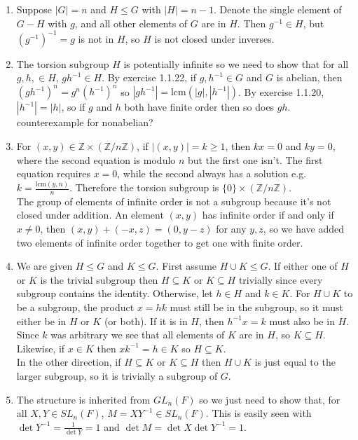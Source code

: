 \documentclass[]{article}
\newcommand{\abs}[1]{\left\vert #1 \right\vert}
\newcommand{\bbz}{\mathbb{Z}}
\begin{document}
\begin{enumerate}
\item Suppose $\abs{G} = n$ and $H \leq G$ with $\abs{H} = n-1$. Denote the single element of $G-H$ with $g$, and all other elements of $G$ are in $H$. Then $g^{-1} \in H$, but $\left( g^{-1} \right)^{-1} = g$ is not in $H$, so $H$ is not closed under inverses.


\item The torsion subgroup $H$ is potentially infinite so we need to show that for all $g,h,\in H$, $gh^{-1}\in H$. By exercise 1.1.22, if $g,h^{-1} \in G$ and $G$ is abelian, then $(gh^{-1})^n = g^n(h^{-1})^n$ so $\abs{gh^{-1}} = \text{lcm}(\abs{g},\abs{h^{-1}})$. By exercise 1.1.20, $\abs{h^{-1}} = \abs{h}$, so if $g$ and $h$ both have finite order then so does $gh$. {\color{red}counterexample for nonabelian?}


\item For $(x,y) \in \bbz \times (\bbz/n\bbz)$, if $\abs{(x,y)} = k \geq 1$, then $kx = 0$ and $ky = 0$, where the second equation is modulo $n$ but the first one isn't. The first equation requires $x = 0$, while the second always has a solution e.g. $k = \frac{\text{lcm}(y,n)}{n}$. Therefore the torsion subgroup is $\{0\} \times (\bbz/n\bbz)$. \\

The group of elements of infinite order is not a subgroup because it's not closed under addition. An element $(x,y)$ has infinite order if and only if $x\neq 0$, then $(x,y) + (-x,z) = (0,y-z)$ for any $y,z$, so we have added two elements of infinite order together to get one with finite order.


\item We are given $H\leq G$ and $K\leq G$. First assume $H\cup K \leq G$. If either one of $H$ or $K$ is the trivial subgroup then $H \subseteq K$ or $K\subseteq H$ trivially since every subgroup contains the identity. Otherwise, let $h \in H$ and $k \in K$. For $H\cup K$ to be a subgroup, the product $x = hk$ must still be in the subgroup, so it must either be in $H$ or $K$ (or both). If it is in $H$, then $h^{-1}x = k$ must also be in $H$. Since $k$ was arbitrary we see that all elements of $K$ are in $H$, so $K \subseteq H$. Likewise, if $x \in K$ then $xk^{-1} = h \in K$ so $H \subseteq K$. \\

In the other direction, if $H\subseteq K$ or $K\subseteq H$ then $H\cup K$ is just equal to the larger subgroup, so it is trivially a subgroup of $G$.


\item The structure is inherited from $GL_n(F)$ so we just need to show that, for all $X,Y \in SL_n(F)$, $M = XY^{-1} \in SL_n(F)$. This is easily seen with $\det Y^{-1} = \frac{1}{\det Y} = 1$ and $\det M = \det X \det Y^{-1} = 1$.



\end{enumerate}
\end{document}
